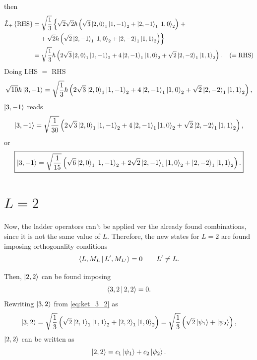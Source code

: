 then 
\begin{align}
    \notag \hat{L}_{+} \left\{ \text{RHS} \right\} &= \sqrt{\frac{1}{3}} \left\{ \sqrt{2} 
        \sqrt{2} \hbar \left( \sqrt{3} \Ket{2,0}_1 \Ket{1,-1}_2 + \Ket{2,-1}_1 \Ket{1,0}_2 \right) \right. + \\
                                           & \left. \phantom{=} +
        \sqrt{2} \hbar \left( \sqrt{2} \Ket{2,-1}_1 \Ket{1,0}_2 + \Ket{2,-2}_1 \Ket{1,1}_2 \right)
        \right\} \\
                                           &= \sqrt{\frac{1}{3}} \hbar \left( 2 \sqrt{3} \Ket{2,0}_1 \Ket{1,-1}_2 + 4 \Ket{2,-1}_1 \Ket{1,0}_2 + \sqrt{2} \Ket{2,-2}_1 \Ket{1,1}_2 \right).
                                           \quad \left( =\text{RHS} \right)
\end{align}
Doing LHS $=$ RHS
\begin{equation}
    \sqrt{10} \hbar \Ket{3,-1} =
    \sqrt{\frac{1}{3}} \hbar \left( 2 \sqrt{3} \Ket{2,0}_1 \Ket{1,-1}_2 + 4 \Ket{2,-1}_1 \Ket{1,0}_2 + \sqrt{2} \Ket{2,-2}_1 \Ket{1,1}_2 \right),
\end{equation}
$\Ket{3,-1}$ reads
\begin{equation}
    \Ket{3,-1} =
    \sqrt{\frac{1}{30}} \left( 2 \sqrt{3} \Ket{2,0}_1 \Ket{1,-1}_2 + 4 \Ket{2,-1}_1 \Ket{1,0}_2 + \sqrt{2} \Ket{2,-2}_1 \Ket{1,1}_2 \right),
\end{equation}
or
\begin{equation}
    \boxed{
        \Ket{3,-1} =
        \sqrt{\frac{1}{15}} \left( \sqrt{6} \Ket{2,0}_1 \Ket{1,-1}_2 + 2\sqrt{2} \Ket{2,-1}_1 \Ket{1,0}_2 + \Ket{2,-2}_1 \Ket{1,1}_2 \right).
    }
\end{equation}

\section{$L=2$}

Now, the ladder operators can't be applied ver the already found combinations, since it is not the same value of $L$.
Therefore, the new states for $L=2$ are found imposing orthogonality conditions 
\begin{equation}\label{eq:orthogonality_condition}
    \Braket{L, M_L | L', M_{L'}} = 0 \qquad L' \not = L .
\end{equation}

Then, $\Ket{2,2}$ can be found imposing 
\begin{equation}\label{eq:orthog_cond_2_2}
    \Braket{3,2 | 2,2} = 0 .
\end{equation}
Rewriting $\Ket{3,2}$ from \cref{eq:ket_3_2} as 
\begin{equation}
    \Ket{3,2} = 
    \sqrt{\frac{1}{3}} \left( \sqrt{2} \Ket{2,1}_1 \Ket{1,1}_2 + \Ket{2,2}_1 \Ket{1,0}_2 \right) =
    \sqrt{\frac{1}{3}} \left( \sqrt{2} \Ket{\psi_1} + \Ket{\psi_2} \right),
\end{equation}
$\Ket{2,2}$ can be written as 
\begin{equation}\label{eq:lin_comb_2_2}
    \Ket{2,2} =
    c_1 \Ket{\psi_1} + c_2 \Ket{\psi_2}.
\end{equation}

